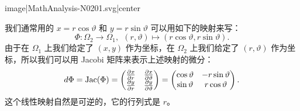 { {image|MathAnalysis-N0201.svg|center}}

我们通常用的 $x=r\cos\vartheta$ 和 $y=r\sin \vartheta$ 可以用如下的映射来写：
\[\Phi\colon \Omega_2\rightarrow \Omega_1, \ \ (r,\vartheta)\mapsto (r\cos\vartheta, r\sin \vartheta). \]
由于在 $\Omega_1$ 上我们给定了 $(x,y)$ 作为坐标，在 $\Omega_2$ 上我们给定了 $(r,\vartheta)$ 作为坐标，所以我们可以用 Jacobi 矩阵来表示上述映射的微分：
\[d\Phi = {\rm Jac}(\Phi) = \begin{pmatrix}
   \frac{\partial x}{\partial r}&  \frac{\partial x}{\partial \vartheta} \\
    \frac{\partial y}{\partial r} &  \frac{\partial y}{\partial \vartheta} \\
  \end{pmatrix} = \begin{pmatrix}
  \cos\vartheta&    -r\sin\vartheta \\
     \sin\vartheta &    r\cos\vartheta\\
  \end{pmatrix}.\]
这个线性映射自然是可逆的，它的行列式是 $r$。
